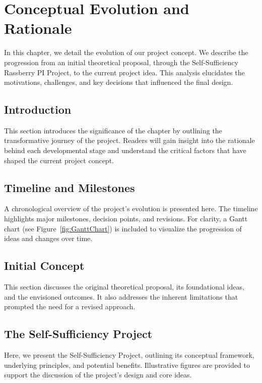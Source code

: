 \chapter{Conceptual Evolution and Rationale}
\label{chap:Conceptual_Evolution_and_Rationale}

In this chapter, we detail the evolution of our project concept. 
We describe the progression from an initial theoretical proposal, through the Self-Sufficiency Rassberry PI Project, 
to the current project idea. This analysis elucidates the motivations, challenges, and key decisions that influenced the final design.


\section{Introduction}
This section introduces the significance of the chapter by outlining the transformative journey of the project. Readers will gain insight into the rationale behind each developmental stage and understand the critical factors that have shaped the current project concept.

\section{Timeline and Milestones}
A chronological overview of the project’s evolution is presented here. The timeline highlights major milestones, decision points, and revisions. For clarity, a Gantt chart (see Figure~\ref{fig:GanttChart}) is included to visualize the progression of ideas and changes over time.

\section{Initial Concept}
This section discusses the original theoretical proposal, its foundational ideas, and the envisioned outcomes. It also addresses the inherent limitations that prompted the need for a revised approach.

\section{The Self-Sufficiency Project}
Here, we present the Self-Sufficiency Project, outlining its conceptual framework, underlying principles, and potential benefits. Illustrative figures are provided to support the discussion of the project’s design and core ideas.

